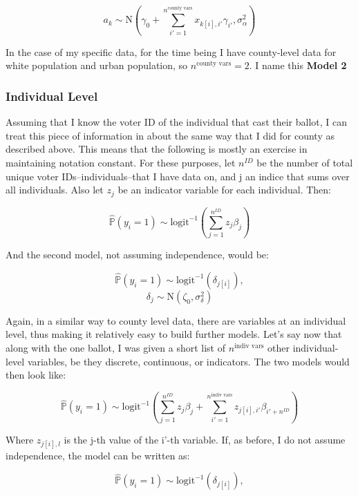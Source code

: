 \documentclass[12pt,twoside]{reedthesis}
\begin{document}
  \[a_{k} \sim \text{N}(\gamma_0 + \sum_{i'=1}^{n^{\text{county vars}}}x_{k[i], i'}\gamma_{i'}, \sigma_{\alpha}^2)\]
  
  In the case of my specific data, for the time being I have county-level
  data for white population and urban population, so
  \(n^{\text{county vars}} = 2\). I name this \textbf{Model 2}
  
  \subsubsection{Individual Level}\label{individual-level}
  
  Assuming that I know the voter ID of the individual that cast their
  ballot, I can treat this piece of information in about the same way that
  I did for county as described above. This means that the following is
  mostly an exercise in maintaining notation constant. For these purposes,
  let \(n^{ID}\) be the number of total unique voter
  IDs--individuals--that I have data on, and j an indice that sums over
  all individuals. Also let \(z_{j}\) be an indicator variable for each
  individual. Then:
  
  \[\hat{\mathbb{P}}(y_i = 1) \sim \text{logit}^{-1}(\sum_{j = 1}^{n^{ID}}z_{j}\beta_{j})\]
  
  And the second model, not assuming independence, would be:
  
  \[\hat{\mathbb{P}}(y_i = 1) \sim \text{logit}^{-1}(\delta_{j[i]}), \]
  \[\delta_{j} \sim \text{N}(\zeta_0, \sigma_{\delta}^2)\]
  
  Again, in a similar way to county level data, there are variables at an
  individual level, thus making it relatively easy to build further
  models. Let's say now that along with the one ballot, I was given a
  short list of \(n^{\text{indiv vars}}\) other individual-level
  variables, be they discrete, continuous, or indicators. The two models
  would then look like:
  
  \[\hat{\mathbb{P}}(y_i = 1) \sim \text{logit}^{-1}(\sum_{j = 1}^{n^{ID}}z_{j}\beta_{j} + \sum_{i'=1}^{n^{\text{indiv vars}}}z_{j[i], i'}\beta_{i'+n^{ID}})\]
  
  Where \(z_{j[i], l}\) is the j-th value of the i'-th variable. If, as
  before, I do not assume independence, the model can be written as:
  
  \begin{equation} \tag{Model 3*}
  \hat{\mathbb{P}}(y_i = 1) \sim \text{logit}^{-1}(\delta_{j[i]}),
  \end{equation}
  
\end{document}

